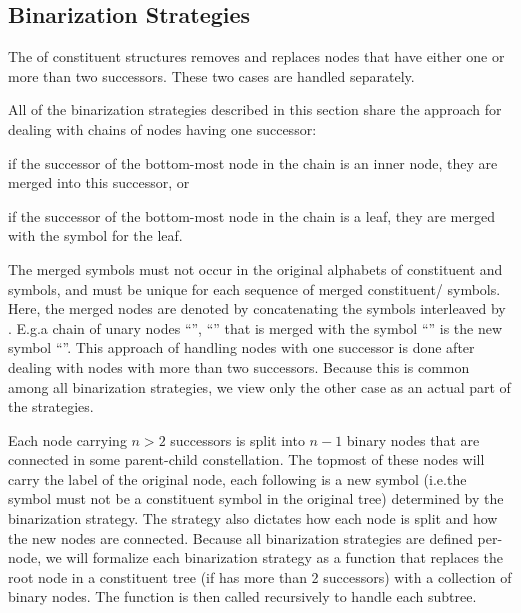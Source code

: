 \documentclass[../document.tex]{subfiles}
\begin{document}
    \subsection{Binarization Strategies}
    The  of constituent structures removes and replaces nodes that have either one or more than two successors.
    These two cases are handled separately.

    All of the binarization strategies described in this section share the approach for dealing with chains of nodes having one successor:
    \begin{inparaenum}
        \item if the successor of the bottom-most node in the chain is an inner node, they are merged into this successor, or
        \item if the successor of the bottom-most node in the chain is a leaf, they are merged with the  symbol for the leaf.
    \end{inparaenum}
    The merged symbols must not occur in the original alphabets of constituent and  symbols, and must be unique for each sequence of merged constituent/ symbols.
    Here, the merged nodes are denoted by concatenating the symbols interleaved by \cn{+}.
    E.g.\@ a chain of unary nodes ``'', ``'' that is merged with the  symbol ``'' is the new symbol ``''.
    This approach of handling nodes with one successor is done after dealing with nodes with more than two successors.
    Because this is common among all binarization strategies, we view only the other case as an actual part of the strategies.

    Each node carrying \( n > 2 \) successors is split into \( n-1 \) binary nodes that are connected in some parent-child constellation.
    The topmost of these nodes will carry the label of the original node, each following is a new symbol (i.e.\@ the symbol must not be a constituent symbol in the original tree) determined by the binarization strategy.
    The strategy also dictates how each node is split and how the new nodes are connected.
    Because all binarization strategies are defined per-node, we will formalize each binarization strategy as a function that replaces the root node in a constituent tree (if has more than 2 successors) with a collection of binary nodes.
    The function is then called recursively to handle each subtree.
\end{document}
